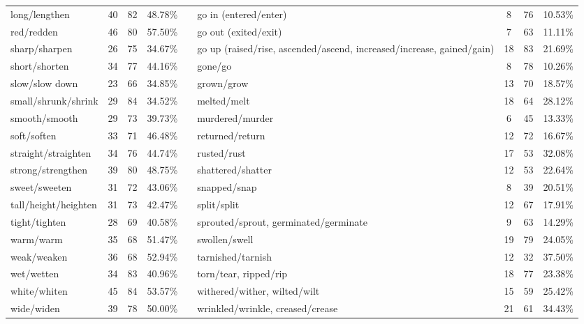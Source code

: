 \begin{tabular}{p{3cm}ccccp{3cm}ccc}
long/lengthen & 40 & 82 & 48.78\% & & go in (entered/enter) & 8 & 76 & 10.53\% \\
red/redden & 46 & 80 & 57.50\% & & go out (exited/exit) & 7 & 63 & 11.11\% \\
sharp/sharpen & 26 & 75 & 34.67\% & & go up (raised/rise, ascended/ascend, increased/increase, gained/gain) & 18 & 83 & 21.69\% \\
short/shorten & 34 & 77 & 44.16\% & & gone/go & 8 & 78 & 10.26\% \\
slow/slow down & 23 & 66 & 34.85\% & & grown/grow & 13 & 70 & 18.57\% \\
small/shrunk/shrink & 29 & 84 & 34.52\% & & melted/melt & 18 & 64 & 28.12\% \\
smooth/smooth & 29 & 73 & 39.73\% & & murdered/murder & 6 & 45 & 13.33\% \\
soft/soften & 33 & 71 & 46.48\% & & returned/return & 12 & 72 & 16.67\% \\
straight/straighten & 34 & 76 & 44.74\% & & rusted/rust & 17 & 53 & 32.08\% \\
strong/strengthen & 39 & 80 & 48.75\% & & shattered/shatter & 12 & 53 & 22.64\% \\
sweet/sweeten & 31 & 72 & 43.06\% & & snapped/snap & 8 & 39 & 20.51\% \\
tall/height/heighten & 31 & 73 & 42.47\% & & split/split & 12 & 67 & 17.91\% \\
tight/tighten & 28 & 69 & 40.58\% & & sprouted/sprout, germinated/germinate & 9 & 63 & 14.29\% \\
warm/warm & 35 & 68 & 51.47\% & & swollen/swell & 19 & 79 & 24.05\% \\
weak/weaken & 36 & 68 & 52.94\% & & tarnished/tarnish & 12 & 32 & 37.50\% \\
wet/wetten & 34 & 83 & 40.96\% & & torn/tear, ripped/rip & 18 & 77 & 23.38\% \\
white/whiten & 45 & 84 & 53.57\% & & withered/wither, wilted/wilt & 15 & 59 & 25.42\% \\
wide/widen & 39 & 78 & 50.00\% & & wrinkled/wrinkle, creased/crease & 21 & 61 & 34.43\%
\end{tabular}